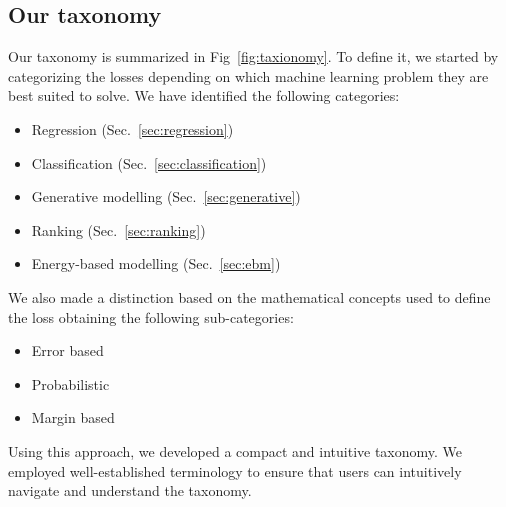 \documentclass[sn-mathphys-num]{sn-jnl}%
\begin{document}
    
    \subsection{Our taxonomy}
    
    Our taxonomy is summarized in Fig~\ref{fig:taxionomy}. To define it, we started by categorizing the losses depending on which machine learning problem they are best suited to solve. 
    We have identified the following categories:
    \begin{itemize}
        \item Regression (Sec.~\ref{sec:regression})
        \item Classification (Sec.~\ref{sec:classification})
        \item Generative modelling (Sec.~\ref{sec:generative})
        \item Ranking (Sec.~\ref{sec:ranking})
        \item Energy-based modelling (Sec.~\ref{sec:ebm})
    \end{itemize}  
    We also made a distinction based on the mathematical concepts used to define the loss obtaining the following sub-categories:
    \begin{itemize}
        \item Error based 
        \item Probabilistic
        \item Margin based
    \end{itemize}
    
    
    Using this approach, we developed a compact and intuitive taxonomy. We employed well-established terminology to ensure that users can intuitively navigate and understand the taxonomy.

    
        
\end{document}
